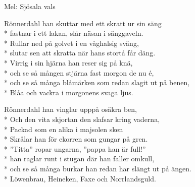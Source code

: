 \begin{SongText}[Rönnerdahl]
    \begin{SongInfo}
        Mel: Sjösala vals
    \end{SongInfo}
    \begin{SongVerse}
        Rönnerdahl han skuttar med ett skratt ur sin säng\\*%
        fastnar i ett lakan, slår näsan i sänggaveln.\\*%
        Rullar ned på golvet i en våghalsig sväng,\\*%
        slutar sen att skratta när hans stortå får däng.\\*%
        Virrig i sin hjärna han reser sig på knä,\\*%
        och se så mången stjärna fast morgon de nu é,\\*%
        och se så många blåmärken som redan slagit ut på benen,\\*%
        Blåa och vackra i morgonens svaga ljus.
    \end{SongVerse}
    \begin{SongVerse}
        Rönnerdahl han vinglar upppå osäkra ben,\\*%
        Och den vita skjortan den slafsar kring vaderna,\\*%
        Packad som en alika i majsolen sken\\*%
        Skrålar han för ekorren som gungar på gren.\\*%
        ”Titta” ropar ungarna, ”pappa han är full!”\\*%
        han raglar runt i stugan där han faller omkull,\\*%
        och se så många burkar han redan har slängt ut på ängen.\\*%
        Löwenbrau, Heineken, Faxe och Norrlandsguld.
    \end{SongVerse}
\end{SongText}
